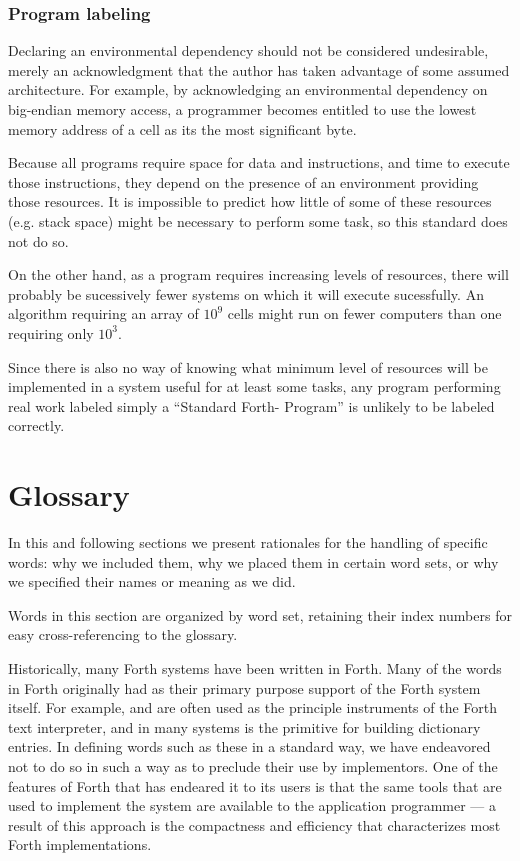 \setcounter{subsubsection}{1}
\subsubsection{Program labeling} %
\label{rat:label:prog}

Declaring an environmental dependency should not be considered
undesirable, merely an acknowledgment that the author has taken
advantage of some assumed architecture.
For example, by acknowledging an environmental dependency on
big-endian memory access, a programmer becomes entitled to use
the lowest memory address of a cell as its the most significant byte.

Because all programs require space for data and instructions, and
time to execute those instructions, they depend on the presence of
an environment providing those resources. It is impossible to predict
how little of some of these resources (e.g. stack space) might be
necessary to perform some task, so this standard does not do so.

On the other hand, as a program requires increasing levels of
resources, there will probably be sucessively fewer systems on
which it will execute sucessfully. An algorithm requiring an array
of $10^9$ cells might run on fewer computers than one requiring
only $10^3$.

Since there is also no way of knowing what minimum level of resources
will be implemented in a system useful for at least some tasks, any
program performing real work labeled simply
a ``Standard Forth-\snapshot{} Program'' is unlikely to be labeled
correctly.


\section{Glossary} %

In this and following sections we present rationales for the handling
of specific words: why we included them, why we placed them in certain
word sets, or why we specified their names or meaning as we did.

Words in this section are organized by word set, retaining their index
numbers for easy cross-referencing to the glossary.

Historically, many Forth systems have been written in Forth. Many of
the words in Forth originally had as their primary purpose support of
the Forth system itself. For example,  and  are
often used as the principle instruments of the Forth text interpreter,
and  in many systems is the primitive for building
dictionary entries. In defining words such as these in a standard way,
we have endeavored not to do so in such a way as to preclude their use
by implementors. One of the features of Forth that has endeared it to
its users is that the same tools that are used to implement the system
are available to the application programmer --- a result of this
approach is the compactness and efficiency that characterizes most
Forth implementations.

